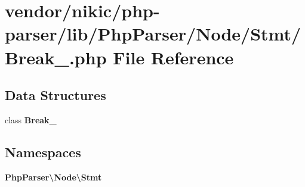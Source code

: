 \section{vendor/nikic/php-\/parser/lib/\+Php\+Parser/\+Node/\+Stmt/\+Break\+\_\+.php File Reference}
\label{_break___8php}
\subsection*{Data Structures}
\begin{DoxyCompactItemize}
\item 
class {\bf Break\+\_\+}
\end{DoxyCompactItemize}
\subsection*{Namespaces}
\begin{DoxyCompactItemize}
\item 
 {\bf Php\+Parser\textbackslash{}\+Node\textbackslash{}\+Stmt}
\end{DoxyCompactItemize}
